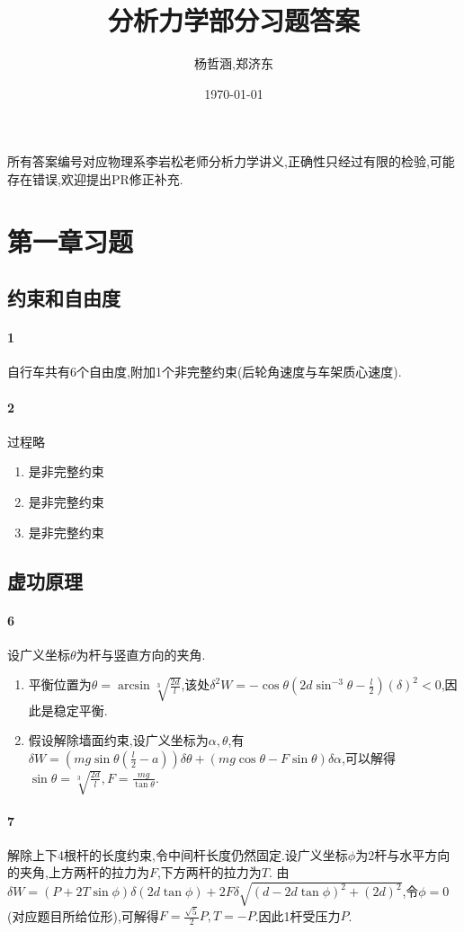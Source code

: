 \documentclass[a4paper]{article}
\title{分析力学部分习题答案}
\author{杨哲涵,郑济东}
\date{\today}
\begin{document}
\maketitle
所有答案编号对应物理系李岩松老师分析力学讲义,正确性只经过有限的检验,可能存在错误,欢迎提出PR修正补充.
\section{第一章习题}
\subsection{约束和自由度}
\paragraph{1}
自行车共有6个自由度,附加1个非完整约束(后轮角速度与车架质心速度).
\paragraph{2}
过程略
\begin{enumerate}
    \item 是非完整约束
    \item 是非完整约束
    \item 是非完整约束
\end{enumerate}
\subsection{虚功原理}
\paragraph{6}
设广义坐标$\theta$为杆与竖直方向的夹角.
\begin{enumerate}
    \item 平衡位置为$\theta=\arcsin\sqrt[3]{\frac{2d}{l}}$,该处$\delta^2W=-\cos\theta(2d\sin^{-3}\theta-\frac{l}{2})(\delta)^2<0$,因此是稳定平衡.
    \item 假设解除墙面约束,设广义坐标为$\alpha,\theta$,有$\delta W=(mg\sin\theta(\frac{l}{2}-a))\delta\theta+(mg\cos\theta-F\sin\theta)\delta\alpha$,可以解得$\sin\theta=\sqrt[3]{\frac{2d}{l}},F=\frac{mg}{\tan\theta}$.
\end{enumerate}
\paragraph{7}
解除上下4根杆的长度约束,令中间杆长度仍然固定.设广义坐标$\phi$为2杆与水平方向的夹角,上方两杆的拉力为$F$,下方两杆的拉力为$T$.
由$\delta W=(P+2T\sin\phi)\delta(2d\tan\phi)+2F\delta\sqrt{(d-2d\tan\phi)^2+(2d)^2}$,令$\phi=0$(对应题目所给位形),可解得$F=\frac{\sqrt{5}}{2}P,T=-P$.因此1杆受压力$P$.
\end{document}
